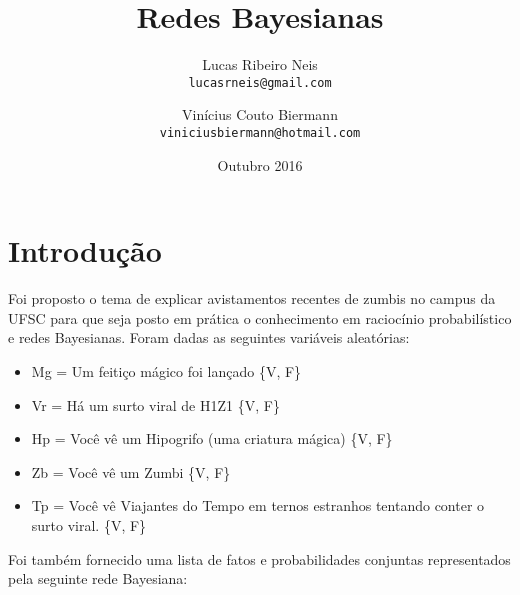 \documentclass{article}
\begin{document}
\title{\textbf{Redes Bayesianas}}
\author{
    Lucas Ribeiro Neis\\
     {\texttt{lucasrneis@gmail.com}}
     \and
     Vinícius Couto Biermann\\
      {\texttt{viniciusbiermann@hotmail.com}}
      \vspace{-50mm}
}
\date{Outubro 2016}

\maketitle

\section{Introdução}

Foi proposto o tema de explicar avistamentos recentes de zumbis no campus da UFSC para que seja posto em prática o conhecimento em 
raciocínio probabilístico e redes Bayesianas. Foram dadas as seguintes variáveis aleatórias:

\begin{itemize}
    \item Mg = Um feitiço mágico foi lançado \{V, F\}
    \item Vr = Há um surto viral de H1Z1 \{V, F\}
    \item Hp = Você vê um Hipogrifo (uma criatura mágica) \{V, F\}
    \item Zb = Você vê um Zumbi \{V, F\}
    \item Tp = Você vê Viajantes do Tempo em ternos estranhos tentando conter o surto viral. \{V, F\}
\end{itemize}

Foi também fornecido uma lista de fatos e probabilidades conjuntas representados pela seguinte rede Bayesiana:
\end{document}

